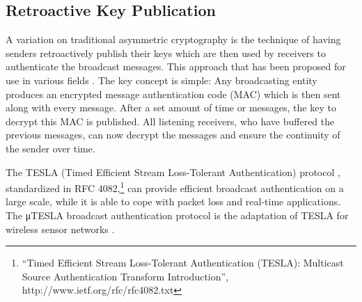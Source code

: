 \documentclass[english]{IEEEtran}
\begin{document}
\subsection{Retroactive Key Publication\label{sub:Retroactive-Key-Publication}}

A variation on traditional asymmetric cryptography is the technique
of having senders retroactively publish their keys which are then
used by receivers to authenticate the broadcast messages. This approach
that has been proposed for use in various fields \cite{Perrig2003,Perrig2000}.
The key concept is simple: Any broadcasting entity produces an encrypted
message authentication code (MAC) which is then sent along with every
message. After a set amount of time or messages, the key to decrypt
this MAC is published. All listening receivers, who have buffered
the previous messages, can now decrypt the messages and ensure the
continuity of the sender over time.

The TESLA (Timed Efficient Stream Loss-Tolerant Authentication) protocol
\cite{Perrig2005}, standardized in RFC 4082,\footnote{``Timed Efficient Stream Loss-Tolerant Authentication (TESLA): Multicast
Source Authentication Transform Introduction'', http://www.ietf.org/rfc/rfc4082.txt} can provide efficient broadcast authentication on a large scale,\emph{
}while it is able to cope with packet loss and real-time applications\emph{.
}The μTESLA broadcast authentication protocol is the adaptation of
TESLA for wireless sensor networks \cite{Perrig2002}.
\end{document}

